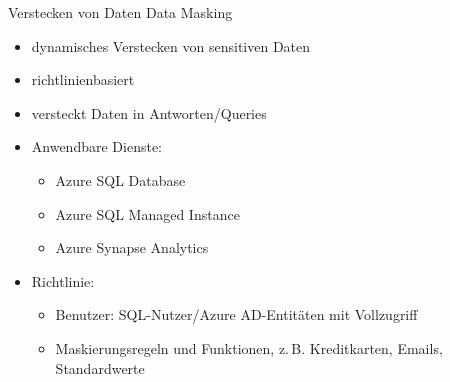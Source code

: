 \begin{flashcard}[Definition]{Verstecken von Daten}
  Data Masking
  \begin{itemize}
    \item dynamisches Verstecken von sensitiven Daten
    \item richtlinienbasiert
    \item versteckt Daten in Antworten/Queries
    \item Anwendbare Dienste:
      \begin{itemize}
        \item Azure SQL Database
        \item Azure SQL Managed Instance
        \item Azure Synapse Analytics
      \end{itemize}
    \item Richtlinie:
      \begin{itemize}
        \item Benutzer: SQL-Nutzer/Azure AD-Entitäten mit Vollzugriff
        \item Maskierungsregeln und Funktionen, z.\,B.\newline
          Kreditkarten, Emails, Standardwerte
      \end{itemize}
  \end{itemize}
\end{flashcard}

